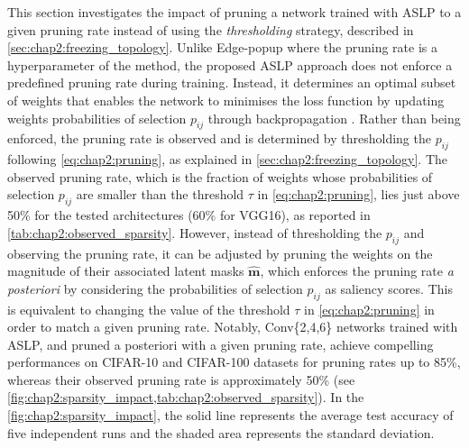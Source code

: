 This section investigates the impact of pruning a network trained with \ac{ASLP}
to a given pruning rate instead of using the \emph{thresholding} strategy,
described in \cref{sec:chap2:freezing_topology}. Unlike Edge-popup
\cite{DBLP:conf/cvpr/RamanujanWKFR20} where the pruning rate is a hyperparameter
of the method, the proposed \ac{ASLP} approach does not enforce a predefined
pruning rate during training. Instead, it determines an optimal subset of
weights that enables the network to minimises the loss function by updating
weights probabilities of selection $p_{ij}$ through backpropagation
\cite{rumelhart1986learning}. Rather than being enforced, the pruning rate is
observed and is determined by thresholding the $p_{ij}$ following
\cref{eq:chap2:pruning}, as explained in \cref{sec:chap2:freezing_topology}. The
observed pruning rate, which is the fraction of weights whose probabilities of
selection $p_{ij}$ are smaller than the threshold $\tau$ in
\cref{eq:chap2:pruning}, lies just above 50\% for the tested architectures (60\%
for VGG16), as reported in \cref{tab:chap2:observed_sparsity}. However, instead
of thresholding the $p_{ij}$ and observing the pruning rate, it can be adjusted
by pruning the weights on the magnitude of their associated latent masks
$\bm{\hat{m}}$, which enforces the pruning rate \emph{a posteriori} by
considering the probabilities of selection $p_{ij}$ as saliency scores. This is
equivalent to changing the value of the threshold $\tau$ in
\cref{eq:chap2:pruning} in order to match a given pruning rate. Notably,
Conv\{2,4,6\} networks trained with \ac{ASLP}, and pruned a posteriori with a
given pruning rate, achieve compelling performances on CIFAR-10 and CIFAR-100
datasets for pruning rates up to 85\%, whereas their observed pruning rate is
approximately 50\% (see
\cref{fig:chap2:sparsity_impact,tab:chap2:observed_sparsity}). In the
\cref{fig:chap2:sparsity_impact}, the solid line represents the average test
accuracy of five independent runs and the shaded area represents the standard
deviation.\\


